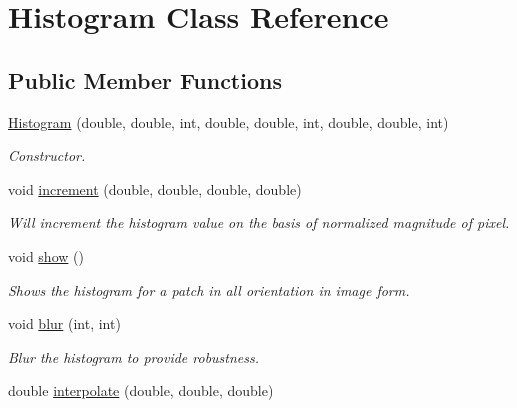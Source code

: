 \hypertarget{classHistogram}{\section{\-Histogram \-Class \-Reference}
\label{classHistogram}
}
\subsection*{\-Public \-Member \-Functions}
\begin{DoxyCompactItemize}
\item 
\hypertarget{classHistogram_ad28261323845d54ecd0d0218e7942f1f}{\hyperlink{classHistogram_ad28261323845d54ecd0d0218e7942f1f}{\-Histogram} (double, double, int, double, double, int, double, double, int)}\label{classHistogram_ad28261323845d54ecd0d0218e7942f1f}

\begin{DoxyCompactList}\small\item\em \-Constructor. \end{DoxyCompactList}\item 
void \hyperlink{classHistogram_a8bdace3d883806855fb401b4ed1ebeed}{increment} (double, double, double, double)
\begin{DoxyCompactList}\small\item\em \-Will increment the histogram value on the basis of normalized magnitude of pixel. \end{DoxyCompactList}\item 
\hypertarget{classHistogram_a9423dec20de4a1034360e813656c44c1}{void \hyperlink{classHistogram_a9423dec20de4a1034360e813656c44c1}{show} ()}\label{classHistogram_a9423dec20de4a1034360e813656c44c1}

\begin{DoxyCompactList}\small\item\em \-Shows the histogram for a patch in all orientation in image form. \end{DoxyCompactList}\item 
\hypertarget{classHistogram_aa1bdca4cadfc0b6e2810ea95379dac3e}{void \hyperlink{classHistogram_aa1bdca4cadfc0b6e2810ea95379dac3e}{blur} (int, int)}\label{classHistogram_aa1bdca4cadfc0b6e2810ea95379dac3e}

\begin{DoxyCompactList}\small\item\em \-Blur the histogram to provide robustness. \end{DoxyCompactList}\item 
\hypertarget{classHistogram_ab0eb6d0a65594891669eb4b76dc842d7}{double \hyperlink{classHistogram_ab0eb6d0a65594891669eb4b76dc842d7}{interpolate} (double, double, double)}\label{classHistogram_ab0eb6d0a65594891669eb4b76dc842d7}


\end{DoxyCompactItemize}
